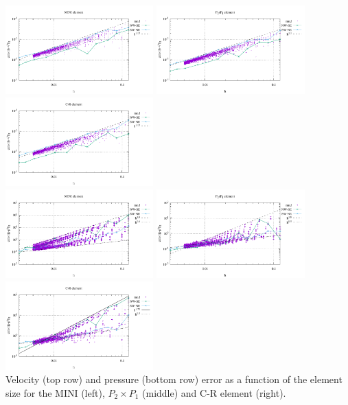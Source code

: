 \begin{center}
\includegraphics[width=5.7cm]{python_codes/fieldstone_112/results/exp5_tridiag/errors_V_MINI.pdf}
\includegraphics[width=5.7cm]{python_codes/fieldstone_112/results/exp5_tridiag/errors_V_P2P1.pdf}
\includegraphics[width=5.7cm]{python_codes/fieldstone_112/results/exp5_tridiag/errors_V_CR.pdf}\\
\includegraphics[width=5.7cm]{python_codes/fieldstone_112/results/exp5_tridiag/errors_P_MINI.pdf}
\includegraphics[width=5.7cm]{python_codes/fieldstone_112/results/exp5_tridiag/errors_P_P2P1.pdf}
\includegraphics[width=5.7cm]{python_codes/fieldstone_112/results/exp5_tridiag/errors_P_CR.pdf}\\
{\captionfont Velocity (top row) and pressure (bottom row) error as a function of the element size
for the MINI (left), $P_2\times P_1$ (middle) and C-R element (right).}
\end{center}



